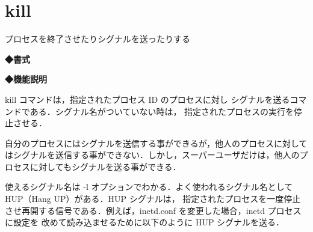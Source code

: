 
\section{kill}
プロセスを終了させたりシグナルを送ったりする\par
\label{cmd:kill}
\noindent
{\bf ◆書式}
\begin{center}
\begin{screen}
\begin{alltt}
% kill プロセス ID
% kill [signal] プロセス ID
\end{alltt}
\end{screen}
\end{center}

\noindent
{\bf ◆機能説明}

kill コマンドは，指定されたプロセス ID のプロセスに対し
シグナルを送るコマンドである．シグナル名がついていない時は，
指定されたプロセスの実行を停止させる．\par
自分のプロセスにはシグナルを送信する事ができるが，他人のプロセスに対してはシグナルを送信する事ができない．しかし，スーパーユーザだけは，他人のプロセスに対してもシグナルを送る事ができる．\par
使えるシグナル名は -l オプションでわかる．よく使われるシグナル名として HUP（Hang UP）がある．HUP シグナルは，
指定されたプロセスを一度停止させ再開する信号である．例えば，inetd.conf を変更した場合，inetd プロセスに設定を
改めて読み込ませるために以下のように HUP シグナルを送る．


